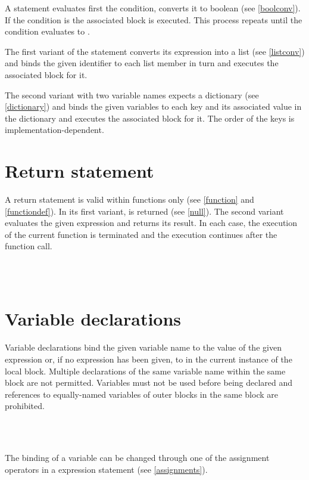 \noindent
A  statement evaluates first the condition,
converts it to boolean (see \ref{boolconv}). If the condition
is  the associated block is executed. This process
repeats until the condition evaluates to .

The first variant of the  statement converts its
expression into a list (see \ref{listconv}) and binds the given identifier
to each list member in turn and executes the associated block for it.

The second variant with two variable names expects a dictionary
(see \ref{dictionary}) and binds the given variables to each
key and its associated value in the dictionary and executes the
associated block for it. The order of the keys is
implementation-dependent.

\section{Return statement}\label{return}

A return statement is valid within functions only (see \ref{function}
and \ref{functiondef}). In its first variant,  is
returned (see \ref{null}). The second variant evaluates the
given expression and returns its result. In each case, the
execution of the current function is terminated and the execution
continues after the function call.

\begin{grammar}
      \produces {} \\
      \produces {}  \\
\end{grammar}

\section{Variable declarations}\label{var}

Variable declarations bind the given variable name to the value of the
given expression or, if no expression has been given, to 
in the current instance of the local block. Multiple declarations of the
same variable name within the same block are not permitted. Variables
must not be used before being declared and references to equally-named
variables of outer blocks in the same block are prohibited.

\begin{grammar}
      \produces {}  \\
      \produces {} 
	 \lextoken{=}  \\
\end{grammar}

\noindent
The binding of a variable can be changed through one of the
assignment operators in a expression statement (see \ref{assignments}).

\endinput
